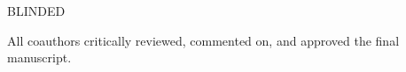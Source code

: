\documentclass[man,a4paper,mask]{apa6}\usepackage[]{graphicx}\usepackage[]{color}
\begin{document}
BLINDED

All coauthors critically reviewed, commented on, and approved the final manuscript.


\printbibliography
\end{document}
